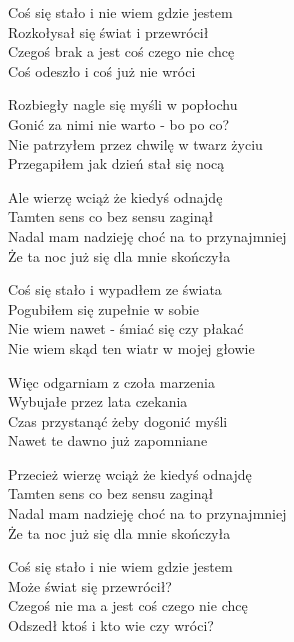 \begin{text}
    Coś się stało i nie wiem gdzie jestem\\
    Rozkołysał się świat i przewrócił\\
    Czegoś brak a jest coś czego nie chcę\\
    Coś odeszło i coś już nie wróci

    Rozbiegły nagle się myśli w popłochu\\
    Gonić za nimi nie warto - bo po co?\\
    Nie patrzyłem przez chwilę w twarz życiu\\
    Przegapiłem jak dzień stał się nocą

    Ale wierzę wciąż że kiedyś odnajdę\\
    Tamten sens co bez sensu zaginął\\
    Nadal mam nadzieję choć na to przynajmniej\\
    Że ta noc już się dla mnie skończyła

    Coś się stało i wypadłem ze świata\\
    Pogubiłem się zupełnie w sobie\\
    Nie wiem nawet - śmiać się czy płakać\\
    Nie wiem skąd ten wiatr w mojej głowie

    Więc odgarniam z czoła marzenia\\
    Wybujałe przez lata czekania\\
    Czas przystanąć żeby dogonić myśli\\
    Nawet te dawno już zapomniane

    Przecież wierzę wciąż że kiedyś odnajdę\\
    Tamten sens co bez sensu zaginął\\
    Nadal mam nadzieję choć na to przynajmniej\\
    Że ta noc już się dla mnie skończyła

    Coś się stało i nie wiem gdzie jestem\\
    Może świat się przewrócił?\\
    Czegoś nie ma a jest coś czego nie chcę\\
    Odszedł ktoś i kto wie czy wróci?
\end{text}
